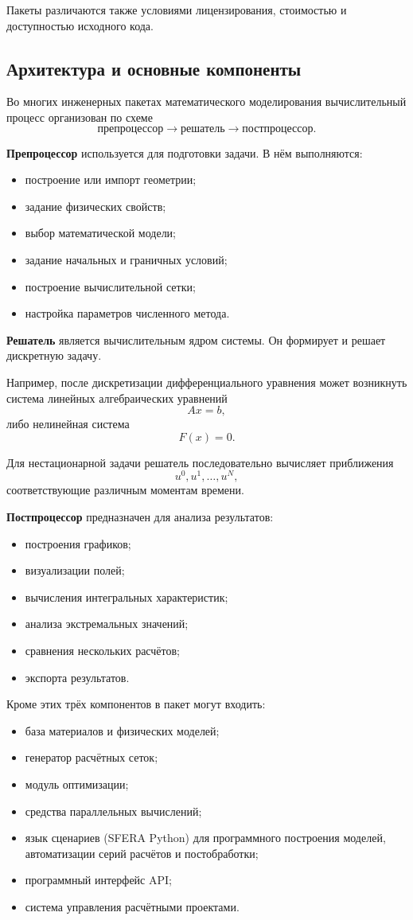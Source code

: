 Пакеты различаются также условиями лицензирования, стоимостью и доступностью исходного кода.

\subsection{Архитектура и основные компоненты}

Во многих инженерных пакетах математического моделирования вычислительный процесс организован по схеме
\[
\text{препроцессор}
\rightarrow
\text{решатель}
\rightarrow
\text{постпроцессор}.
\]

\textbf{Препроцессор} используется для подготовки задачи. В нём выполняются:
\begin{itemize}
	\item построение или импорт геометрии;
	\item задание физических свойств;
	\item выбор математической модели;
	\item задание начальных и граничных условий;
	\item построение вычислительной сетки;
	\item настройка параметров численного метода.
\end{itemize}

\textbf{Решатель} является вычислительным ядром системы. Он формирует и решает дискретную задачу.

Например, после дискретизации дифференциального уравнения может возникнуть система линейных алгебраических уравнений
\[
Ax=b,
\]
либо нелинейная система
\[
F(x)=0.
\]

Для нестационарной задачи решатель последовательно вычисляет приближения
\[
u^0,u^1,\ldots,u^N,
\]
соответствующие различным моментам времени.

\textbf{Постпроцессор} предназначен для анализа результатов:
\begin{itemize}
	\item построения графиков;
	\item визуализации полей;
	\item вычисления интегральных характеристик;
	\item анализа экстремальных значений;
	\item сравнения нескольких расчётов;
	\item экспорта результатов.
\end{itemize}

Кроме этих трёх компонентов в пакет могут входить:
\begin{itemize}
	\item база материалов и физических моделей;
	\item генератор расчётных сеток;
	\item модуль оптимизации;
	\item средства параллельных вычислений;
	\item язык сценариев (SFERA Python) для программного построения моделей, автоматизации серий расчётов и постобработки;
	\item программный интерфейс API;
	\item система управления расчётными проектами.
\end{itemize}

